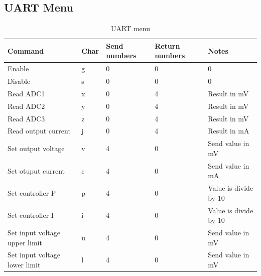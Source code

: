 \documentclass[12pt]{article}%
\begin{document}
\subsection{UART Menu}
\begin{table}[H]
   \centering
   \caption{UART menu}
   \label{tab:menu}
   \begin{tabular}{|p{4cm}|p{1.2cm}|p{1.8cm}|p{1.8cm}|p{4cm}|}
   \hline
      \textbf{Command}              & \textbf{Char}   &  \textbf{Send numbers}   &  \textbf{Return numbers}  &  \textbf{Notes}\\ \hline
      Enable                        & g               &  0                       &  0                        &  0                        \\ \hline
      Disable                       & s               &  0                       &  0                        &  0                        \\ \hline
      Read ADC1                     & x               &  0                       &  4                        &  Result in mV                         \\ \hline
      Read ADC2                     & y               &  0                       &  4                        &  Result in mV                         \\ \hline
      Read ADC3                     & z               &  0                       &  4                        &  Result in mV                         \\ \hline
      Read output current           & j               &  0                       &  4                        &  Result in mA              \\ \hline
      Set output voltage            & v               &  4                       &  0                        &  Send value in mV         \\ \hline
      Set otuput current            & c               &  4                       &  0                        &  Send value in mA    \\ \hline
      Set controller P              & p               &  4                       &  0                        &  Value is divide by 10    \\ \hline
      Set controller I              & i               &  4                       &  0                        &  Value is divide by 10         \\ \hline
      Set input voltage upper limit & u               &  4                       &  0                        &  Send value in mV             \\ \hline
      Set input voltage lower limit & l               &  4                       &  0                        &  Send value in mV         \\ \hline
   \end{tabular}
\end{table}
\end{document}
